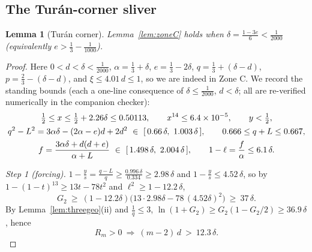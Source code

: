 \documentclass[11pt]{article}
\newtheorem{lemma}[theorem]{Lemma}
\begin{document}
\subsection{The Tur\'an-corner sliver}

\begin{lemma}[Tur\'an corner]\label{lem:turan}
Lemma~\ref{lem:zoneC} holds when $\delta=\tfrac{1-3e}6<\tfrac1{2000}$
(equivalently $e>\tfrac13-\tfrac1{1000}$).
\end{lemma}

\begin{proof}
Here $0<d<\delta<\tfrac1{2000}$, $\alpha=\tfrac13+\delta$,
$e=\tfrac13-2\delta$, $q=\tfrac13+(\delta-d)$, $p=\tfrac23-(\delta-d)$, and
$\xi\le4.01\,d\le1$, so we are indeed in Zone C.  We record the standing
bounds (each a one-line consequence of $\delta\le\tfrac1{2000}$, $d<\delta$;
all are re-verified numerically in the companion checker):
\begin{gather}
        \tfrac12\le x\le\tfrac12+2.26\delta\le0.50113,\qquad
        x^{14}\le6.4\times10^{-5},\qquad y<\tfrac12,\notag\\
        q^2-L^2=3\alpha\delta-(2\alpha-e)d+2d^2\ \in\
        [\,0.66\,\delta,\ 1.003\,\delta\,],\qquad
        0.666\le q+L\le0.667,\notag\\
        f=\frac{3\alpha\delta+d(d+e)}{\alpha+L}\ \in\
        [\,1.498\,\delta,\ 2.004\,\delta\,],\qquad
        1-\ell=\frac f\alpha\le6.1\,\delta .\label{eq:corner-standing}
\end{gather}

\emph{Step 1 (forcing).}  $1-\tfrac ys=\tfrac{q-L}q\ge\frac{0.996\,\delta}{0.334}
\ge2.98\,\delta$ and $1-\tfrac ys\le4.52\,\delta$, so by
$1-(1-t)^{13}\ge13t-78t^2$ and $\ell^2\ge1-12.2\,\delta$,
\[
        G_2\ \ge\ (1-12.2\delta)\bigl(13\cdot2.98\delta-78\,(4.52\delta)^2\bigr)
        \ \ge\ 37\,\delta .
\]
By Lemma~\ref{lem:threegeo}(ii) and $\tfrac1q\le3$, $\ln(1+G_2)\ge
G_2(1-G_2/2)\ge36.9\,\delta$, hence
\begin{equation}\label{eq:corner-forcing}
        R_m>0\ \Longrightarrow\ (m-2)\,d\ >\ 12.3\,\delta .
\end{equation}


\end{proof}
\end{document}
